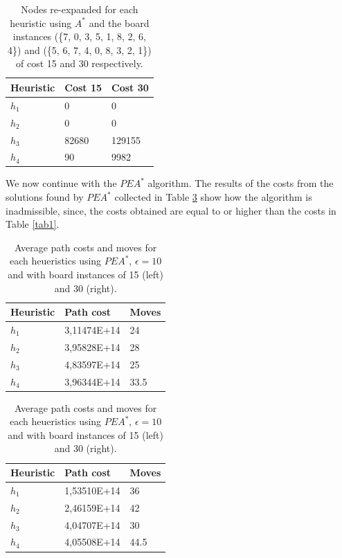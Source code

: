 \documentclass[runningheads]{llncs}
\begin{document}
\begin{table}
    \centering
    \caption{Nodes re-expanded for each heuristic using $A^*$ and the board instances (\{7, 0, 3, 5, 1, 8, 2, 6, 4\}) and (\{5, 6, 7, 4, 0, 8, 3, 2, 1\}) of cost 15 and 30 respectively. }\label{tab3}
    \begin{tabular}{|l|l|l|}
    \hline
    Heuristic & Cost 15 & Cost 30\\
    \hline
    $h_1$ & 0 & 0\\
    $h_2$ & 0 & 0\\
    $h_3$ & 82680 & 129155 \\
    $h_4$ & 90 & 9982\\
    \hline
    \end{tabular}
\end{table}

We now continue with the $PEA^*$ algorithm.
The results of the costs from the solutions found by $PEA^*$ collected in Table \ref{tab2}
show how the algorithm is inadmissible, since, the costs obtained are equal to or higher than the costs in Table \ref{tab1}.

\begin{table}[!htb]
    \caption{Average path costs and moves for each heueristics using $PEA^*$, $\epsilon=10$ and with board instances of 15 (left) and 30 (right).}\label{tab2}
    \begin{minipage}{.5\linewidth}
      \centering
      \begin{tabular}{|l|l|l|}
        \hline
        Heuristic & Path cost & Moves\\
        \hline
        $h_1$ & 3,11474E+14    & 24\\
        $h_2$ & 3,95828E+14    & 28\\
        $h_3$ & 4,83597E+14    & 25\\
        $h_4$ & 3,96344E+14    & 33.5\\
        \hline
        \end{tabular}
    \end{minipage}%
    \begin{minipage}{.5\linewidth}
      \centering
        \begin{tabular}{|l|l|l|}
            \hline 
            Heuristic & Path cost & Moves\\
            \hline
            $h_1$ & 1,53510E+14    & 36\\
            $h_2$ & 2,46159E+14    & 42\\
            $h_3$ & 4,04707E+14    & 30\\
            $h_4$ & 4,05508E+14    & 44.5\\
            \hline
            \end{tabular}
    \end{minipage} 
\end{table}
\end{document}

